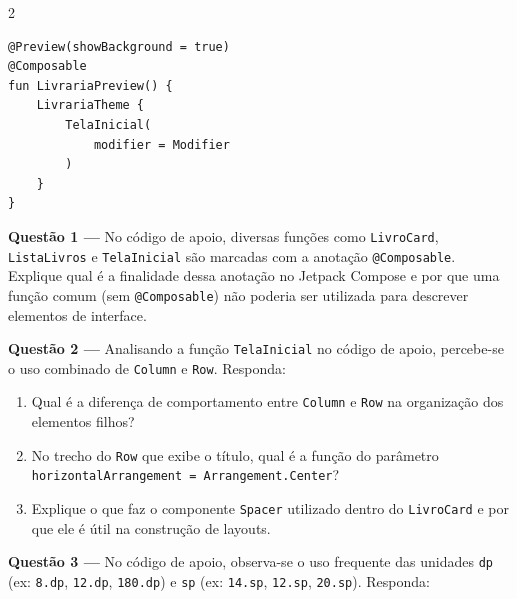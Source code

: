 \documentclass[12pt,a4paper]{article}
\newcommand{\resposta}[1]{
\noindent
\framebox[\textwidth]{
\begin{minipage}{0.98\textwidth}
\vspace*{#1}\null
\end{minipage}
}
}
\begin{document}
\begin{multicols}{2}
\begin{lstlisting}[basicstyle=\scriptsize\ttfamily, breaklines=true]
@Preview(showBackground = true)
@Composable
fun LivrariaPreview() {
    LivrariaTheme {
        TelaInicial(
            modifier = Modifier
        )
    }
}
\end{lstlisting}
\end{multicols}

\vspace{0.5cm}

\textbf{Questão 1 —} No código de apoio, diversas funções como \texttt{LivroCard}, \texttt{ListaLivros} e \texttt{TelaInicial} são marcadas com a anotação \texttt{@Composable}. Explique qual é a finalidade dessa anotação no Jetpack Compose e por que uma função comum (sem \texttt{@Composable}) não poderia ser utilizada para descrever elementos de interface.

\vspace{0.3cm}
\resposta{6cm}

\vspace{0.5cm}

\textbf{Questão 2 —} Analisando a função \texttt{TelaInicial} no código de apoio, percebe-se o uso combinado de \texttt{Column} e \texttt{Row}. Responda:

\begin{enumerate}[label=\alph*)]
    \item Qual é a diferença de comportamento entre \texttt{Column} e \texttt{Row} na organização dos elementos filhos?
    \item No trecho do \texttt{Row} que exibe o título, qual é a função do parâmetro \texttt{horizontalArrangement = Arrangement.Center}?
    \item Explique o que faz o componente \texttt{Spacer} utilizado dentro do \texttt{LivroCard} e por que ele é útil na construção de layouts.
\end{enumerate}

\vspace{0.3cm}
\resposta{7cm}

\vspace{0.5cm}

\textbf{Questão 3 —} No código de apoio, observa-se o uso frequente das unidades \texttt{dp} (ex: \texttt{8.dp}, \texttt{12.dp}, \texttt{180.dp}) e \texttt{sp} (ex: \texttt{14.sp}, \texttt{12.sp}, \texttt{20.sp}). Responda:
\end{document}
